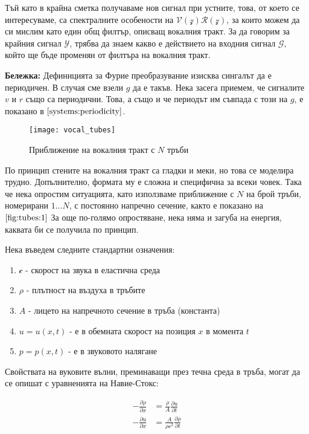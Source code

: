\documentclass[main.tex]{subfiles}
\begin{document}
Тъй като в крайна сметка получаваме нов сигнал при устните, това, от което се интересуваме, са спектралните особености на $\mathcal{V}(\mathcal{z})\mathcal{R}(\mathcal{z})$, за които можем да си мислим като един общ филтър, описващ вокалния тракт. За да говорим за крайния сигнал $\mathcal{Y}$, трябва да знаем какво е действието на входния сигнал $\mathcal{G}$, който ще бъде променян от филтъра на вокалния тракт. 

\begin{footnotesize}
    \textbf{Бележка:} Дефиницията за Фурие преобразувание изисква сингалът да е периодичен. В случая сме взели $g$ да е такъв. Нека засега приемем, че сигналите $v$ и $r$ също са периодични. Това, а също и че периодът им съвпада с този на $g$, е показано в $\autoref{systems:periodicity}$.
\end{footnotesize}

\begin{figure}[ht]%
    \texttt{[image: vocal\_tubes]}%
    \caption{Приближение на вокалния тракт с $N$ тръби}%
    \label{fig:tubes:1}
\end{figure}

По принцип стените на вокалния тракт са гладки и меки, но това се моделира трудно. Допълнително, формата му е сложна и специфична за всеки човек. Така че нека опростим ситуацията, като използваме приближение с $N$ на брой тръби, номерирани $1...N$, с постоянно напречно сечение, както е показано на $\autoref{fig:tubes:1}$
За още по-голямо опростяване, нека няма и загуба на енергия, каквата би се получила по принцип.


Нека въведем следните стандартни означения:
\begin{enumerate}
    \item{$\mathcal{c}$} - скорост на звука в еластична среда
    \item{$\rho$} - плътност на въздуха в тръбите
    \item{$A$} - лицето на напречното сечение в тръба (константа)
    \item{$u = u(x, t)$} - е в обемната скорост на позиция $x$ в момента $t$
    \item{$p = p(x, t)$} - е в звуковото налягане
\end{enumerate}

Свойствата на вуковите вълни, преминаващи през течна среда в тръба, могат да се опишат с уравненията на Навие-Стокс:

\begin{subequations}
    \label{eq:tubes:01}
    \begin{flalign}
        -\frac{\partial\rho}{\partial x} & = \frac{\rho}{A} \frac{\partial u}{\partial t}\\
        -\frac{\partial u}{\partial x} & = \frac{A}{\rho \mathcal{c}^2} \frac{\partial \rho}{\partial t}
    \end{flalign}
\end{subequations}
\end{document}
